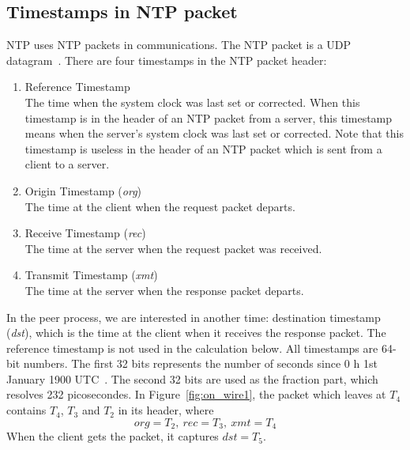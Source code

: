\subsection{Timestamps in NTP packet}%
\label{sub:timestamps_in_ntp_packet}
NTP uses NTP packets in communications. The NTP packet is a UDP
datagram~\cite{rfc5905}. There are four timestamps in the NTP packet header:
\begin{enumerate}
    \item Reference Timestamp\\
        The time when the system clock was last set or corrected. When this
        timestamp is in the header of an NTP packet from a server, this
        timestamp means when the server's system clock was last set or
        corrected. Note that this timestamp is useless in the header of an NTP
        packet which is sent from a client to a server. 
    \item Origin Timestamp (\emph{org})\\
        The time at the client when the request packet departs.
    \item Receive Timestamp (\emph{rec})\\
        The time at the server when the request packet was received.
    \item Transmit Timestamp (\emph{xmt})\\
        The time at the server when the response packet departs.
\end{enumerate}
In the peer process, we are interested in another time: destination
timestamp (\emph{dst}), which is the time at the client when it receives the
response packet. The reference timestamp is not used in the calculation below.
All timestamps are 64-bit numbers. The first 32 bits represents the
number of seconds since 0 h 1st January 1900 UTC~\cite{rfc5905}. The second 32
bits are used as the fraction part, which resolves 232 picosecondes.
In Figure~\ref{fig:on_wire1}, the packet which leaves at $T_4$ contains $T_4$,
$T_3$ and $T_2$ in its header, where $$ \textit{org} = T_2,~\textit{rec} =
T_3,~\textit{xmt} = T_4 $$ When the client gets the packet, it captures
$\textit{dst} = T_5$.

